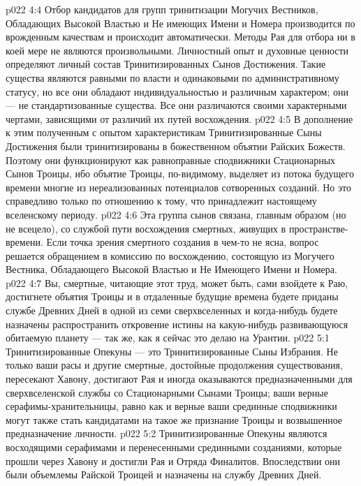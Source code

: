 \vs p022 4:4 \pc Отбор кандидатов для групп тринитизации Могучих Вестников, Обладающих Высокой Властью и Не имеющих Имени и Номера производится по врожденным качествам и происходит автоматически. Методы Рая для отбора ни в коей мере не являются произвольными. Личностный опыт и духовные ценности определяют личный состав Тринитизированных Сынов Достижения. Такие существа являются равными по власти и одинаковыми по административному статусу, но все они обладают индивидуальностью и различным характером; они --- не стандартизованные существа. Все они различаются своими характерными чертами, зависящими от различий их путей восхождения.
\vs p022 4:5 В дополнение к этим полученным с опытом характеристикам Тринитизированные Сыны Достижения были тринитизированы в божественном объятии Райских Божеств. Поэтому они функционируют как равноправные сподвижники Стационарных Сынов Троицы, ибо объятие Троицы, по\hyp{}видимому, выделяет из потока будущего времени многие из нереализованных потенциалов сотворенных созданий. Но это справедливо только по отношению к тому, что принадлежит настоящему вселенскому периоду.
\vs p022 4:6 Эта группа сынов связана, главным образом (но не всецело), со службой пути восхождения смертных, живущих в пространстве\hyp{}времени. Если точка зрения смертного создания в чем\hyp{}то не ясна, вопрос решается обращением в комиссию по восхождению, состоящую из Могучего Вестника, Обладающего Высокой Властью и Не Имеющего Имени и Номера.
\vs p022 4:7 Вы, смертные, читающие этот труд, может быть, сами взойдете к Раю, достигнете объятия Троицы и в отдаленные будущие времена будете приданы службе Древних Дней в одной из семи сверхвселенных и когда\hyp{}нибудь будете назначены распространить откровение истины на какую\hyp{}нибудь развивающуюся обитаемую планету --- так же, как я сейчас это делаю на Урантии.
\vs p022 5:1 Тринитизированные Опекуны --- это Тринитизированные Сыны Избрания. Не только ваши расы и другие смертные, достойные продолжения существования, пересекают Хавону, достигают Рая и иногда оказываются предназначенными для сверхвселенской службы со Стационарными Сынами Троицы; ваши верные серафимы\hyp{}хранительницы, равно как и верные ваши срединные сподвижники могут также стать кандидатами на такое же признание Троицы и возвышенное предназначение личности.
\vs p022 5:2 Тринитизированные Опекуны являются восходящими серафимами и перенесенными срединными созданиями, которые прошли через Хавону и достигли Рая и Отряда Финалитов. Впоследствии они были объемлемы Райской Троицей и назначены на службу Древних Дней.
